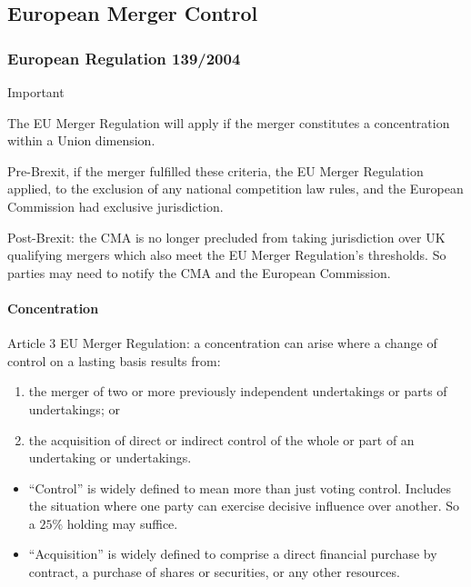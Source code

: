 \documentclass[
]{article}
\providecommand{\tightlist}{%
  \setlength{\itemsep}{0pt}\setlength{\parskip}{0pt}}
\begin{document}
\hypertarget{european-merger-control}{%
\subsection{European Merger Control}\label{european-merger-control}}

\hypertarget{european-regulation-1392004}{%
\subsubsection{European Regulation
139/2004}\label{european-regulation-1392004}}

Important

The EU Merger Regulation will apply if the merger constitutes a
concentration within a Union dimension.

Pre-Brexit, if the merger fulfilled these criteria, the EU Merger
Regulation applied, to the exclusion of any national competition law
rules, and the European Commission had exclusive jurisdiction.

Post-Brexit: the CMA is no longer precluded from taking jurisdiction
over UK qualifying mergers which also meet the EU Merger Regulation's
thresholds. So parties may need to notify the CMA and the European
Commission.

\hypertarget{concentration}{%
\paragraph{Concentration}\label{concentration}}

Article 3 EU Merger Regulation: a concentration can arise where a change
of control on a lasting basis results from:

\begin{enumerate}
\tightlist
\item
  the merger of two or more previously independent undertakings or parts
  of undertakings; or
\item
  the acquisition of direct or indirect control of the whole or part of
  an undertaking or undertakings.
\end{enumerate}

\begin{itemize}
\tightlist
\item
  ``Control'' is widely defined to mean more than just voting control.
  Includes the situation where one party can exercise decisive influence
  over another. So a {\(25\%\)} holding may suffice.
\item
  ``Acquisition'' is widely defined to comprise a direct financial
  purchase by contract, a purchase of shares or securities, or any other
  resources.
\end{itemize}
\end{document}

